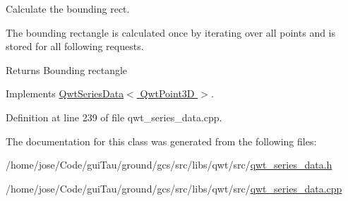 Calculate the bounding rect. 

The bounding rectangle is calculated once by iterating over all points and is stored for all following requests.

\begin{DoxyReturn}{Returns}
Bounding rectangle 
\end{DoxyReturn}


Implements \hyperlink{class_qwt_series_data_aedb969ba51a27d88d26ad7f7cb1c2c7f}{Qwt\-Series\-Data$<$ Qwt\-Point3\-D $>$}.



Definition at line 239 of file qwt\-\_\-series\-\_\-data.\-cpp.



The documentation for this class was generated from the following files\-:\begin{DoxyCompactItemize}
\item 
/home/jose/\-Code/gui\-Tau/ground/gcs/src/libs/qwt/src/\hyperlink{qwt__series__data_8h}{qwt\-\_\-series\-\_\-data.\-h}\item 
/home/jose/\-Code/gui\-Tau/ground/gcs/src/libs/qwt/src/\hyperlink{qwt__series__data_8cpp}{qwt\-\_\-series\-\_\-data.\-cpp}\end{DoxyCompactItemize}
